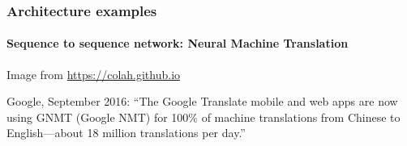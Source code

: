 \documentclass[9pt]{beamer}
\begin{document}
\begin{frame}
  \frametitle{Architecture examples}

  \framesubtitle{Sequence to sequence network: Neural Machine Translation}

  \begin{center}
  \end{center}

  {\small Image from \url{https://colah.github.io}}

  \bigskip

  Google, September 2016: ``The Google Translate mobile and web apps
  are now using GNMT (Google NMT) for 100\% of machine translations
  from Chinese to English—about 18 million translations per day.''

\end{frame}






\end{document}
